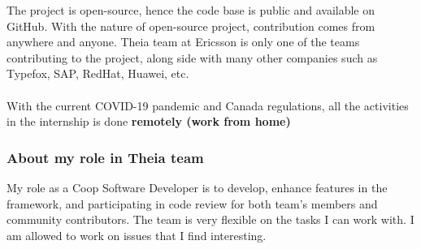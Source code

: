 The project is open-source, hence the code base is public and available on GitHub.
With the nature of open-source project, contribution comes from anywhere and anyone.
Theia team at Ericsson is only one of the teams contributing to the project, along side with many other companies such as Typefox, SAP, RedHat, Huawei, etc.
\\
\\
With the current COVID-19 pandemic and Canada regulations, all the activities in the internship is done \textbf{remotely (work from home) }

\subsubsection{About my role in Theia team}
My role as a Coop Software Developer is to develop, enhance features in the framework, and participating in code review for both team's members and community contributors.
The team is very flexible on the tasks I can work with. I am allowed to work on issues that I find interesting.



